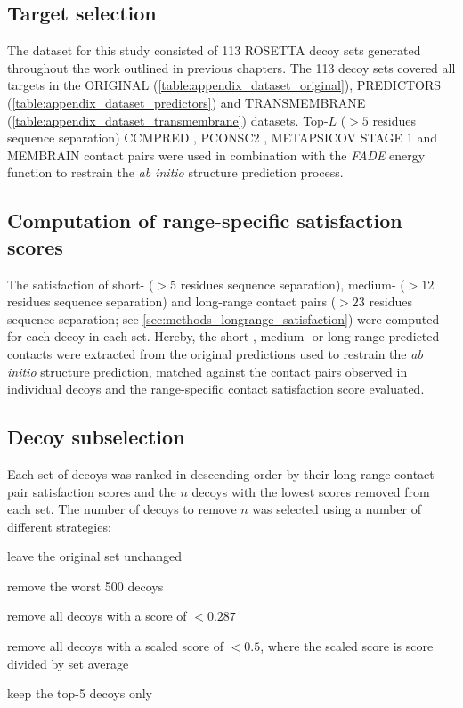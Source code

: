 \subsection{Target selection}
The dataset for this study consisted of 113 ROSETTA decoy sets generated throughout the work outlined in previous chapters. The 113 decoy sets covered all targets in the ORIGINAL (\cref{table:appendix_dataset_original}), PREDICTORS (\cref{table:appendix_dataset_predictors}) and TRANSMEMBRANE (\cref{table:appendix_dataset_transmembrane}) datasets. Top-$L$ ($>5$ residues sequence separation) CCMPRED \cite{Seemayer2014-zp}, PCONSC2 \cite{Skwark2014-qp}, METAPSICOV STAGE 1 \cite{Jones2015-vq} and MEMBRAIN \cite{Yang2013-bf} contact pairs were used in combination with the \textit{FADE} energy function to restrain the \textit{ab initio} structure prediction process.

\subsection{Computation of range-specific satisfaction scores}
The satisfaction of short- ($>5$ residues sequence separation), medium- ($>12$ residues sequence separation) and long-range contact pairs ($>23$ residues sequence separation; see \cref{sec:methods_longrange_satisfaction}) were computed for each decoy in each set. Hereby, the short-, medium- or long-range predicted contacts were extracted from the original predictions used to restrain the \textit{ab initio} structure prediction, matched against the contact pairs observed in individual decoys and the range-specific contact satisfaction score evaluated. 

\subsection{Decoy subselection} \label{sec:ample_decoys_decoy_selection}
Each set of decoys was ranked in descending order by their long-range contact pair satisfaction scores and the $n$ decoys with the lowest scores removed from each set. The number of decoys to remove $n$ was selected using a number of different strategies:

\begin{description}[style=multiline,leftmargin=4cm]
    \item[\textit{NONE}] leave the original set unchanged
    \item[\textit{LINEAR}] remove the worst 500 decoys
    \item[\textit{CUTOFF}] remove all decoys with a score of $<0.287$ 
    \item[\textit{SCALED}] remove all decoys with a scaled score of $<0.5$, where the scaled score is score divided by set average
    \item[\textit{INDIVIDUAL}] keep the top-5 decoys only
\end{description}

